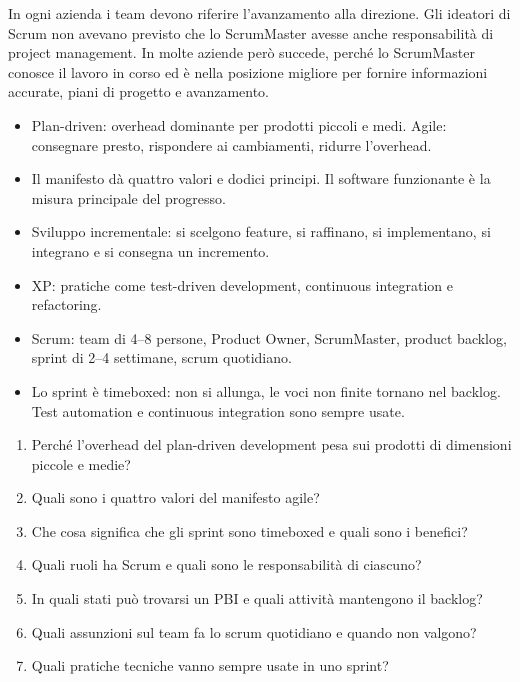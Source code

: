 In ogni azienda i team devono riferire l'avanzamento alla direzione. Gli ideatori di Scrum non avevano previsto che lo
ScrumMaster avesse anche responsabilità di project management. In molte aziende però succede, perché lo ScrumMaster
conosce il lavoro in corso ed è nella posizione migliore per fornire informazioni accurate, piani di progetto e
avanzamento.

\begin{puntichiave}
\begin{itemize}
  \item Plan-driven: overhead dominante per prodotti piccoli e medi. Agile: consegnare presto, rispondere ai
    cambiamenti, ridurre l'overhead.
  \item Il manifesto dà quattro valori e dodici principi. Il software funzionante è la misura principale del progresso.
  \item Sviluppo incrementale: si scelgono feature, si raffinano, si implementano, si integrano e si consegna un
    incremento.
  \item XP: pratiche come test-driven development, continuous integration e refactoring.
  \item Scrum: team di 4--8 persone, Product Owner, ScrumMaster, product backlog, sprint di 2--4 settimane,
    scrum quotidiano.
  \item Lo sprint è timeboxed: non si allunga, le voci non finite tornano nel backlog. Test automation e continuous
    integration sono sempre usate.
\end{itemize}
\end{puntichiave}

\begin{domande}
\begin{enumerate}
  \item Perché l'overhead del plan-driven development pesa sui prodotti di dimensioni piccole e medie?
  \item Quali sono i quattro valori del manifesto agile?
  \item Che cosa significa che gli sprint sono timeboxed e quali sono i benefici?
  \item Quali ruoli ha Scrum e quali sono le responsabilità di ciascuno?
  \item In quali stati può trovarsi un PBI e quali attività mantengono il backlog?
  \item Quali assunzioni sul team fa lo scrum quotidiano e quando non valgono?
  \item Quali pratiche tecniche vanno sempre usate in uno sprint?
\end{enumerate}
\end{domande}
